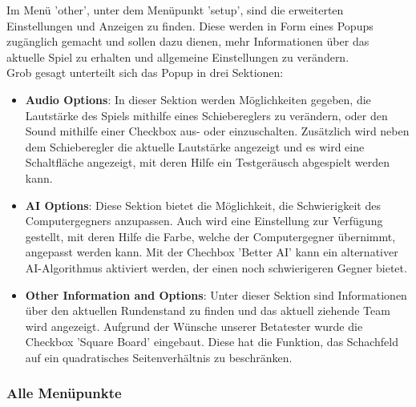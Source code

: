 \documentclass[12pt,a4paper]{article}
\begin{document}
	Im Menü 'other', unter dem Menüpunkt 'setup', sind die erweiterten Einstellungen und Anzeigen zu finden. Diese werden in Form eines Popups zugänglich gemacht und sollen dazu dienen, mehr Informationen über das aktuelle Spiel zu erhalten und allgemeine Einstellungen zu verändern. \\
Grob gesagt unterteilt sich das Popup in drei Sektionen: \\
\begin{itemize}

	\item{\textbf{Audio Options}: In dieser Sektion werden Möglichkeiten gegeben, die Lautstärke des Spiels mithilfe eines Schiebereglers zu verändern, oder den Sound mithilfe einer Checkbox aus- oder einzuschalten. Zusätzlich wird neben dem Schieberegler die aktuelle Lautstärke angezeigt und es wird eine Schaltfläche angezeigt, mit deren Hilfe ein Testgeräusch abgespielt werden kann. } 

	\item{\textbf{AI Options}: Diese Sektion bietet die Möglichkeit, die Schwierigkeit des Computergegners anzupassen. Auch wird eine Einstellung zur Verfügung gestellt, mit deren Hilfe die Farbe, welche der Computergegner übernimmt, angepasst werden kann. Mit der Chechbox 'Better AI' kann ein alternativer AI-Algorithmus aktiviert werden, der einen noch schwierigeren Gegner bietet. }

	\item{\textbf{Other Information and Options}: Unter dieser Sektion sind Informationen über den aktuellen Rundenstand zu finden und das aktuell ziehende Team wird angezeigt. Aufgrund der Wünsche unserer Betatester wurde die Checkbox 'Square Board' eingebaut. Diese hat die Funktion, das Schachfeld auf ein quadratisches Seitenverhältnis zu beschränken.}
	
\end{itemize}

	
	\subsubsection{Alle Menüpunkte}
\end{document}

